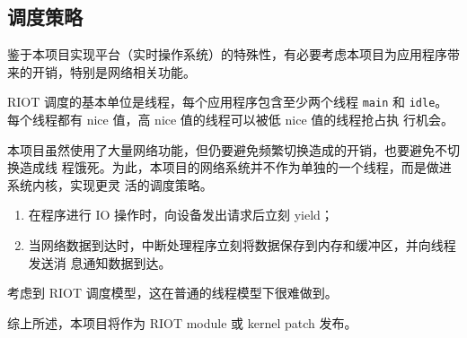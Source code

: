 \documentclass{ctexart}
\begin{document}
\subsection{调度策略}
鉴于本项目实现平台（实时操作系统）的特殊性，有必要考虑本项目为应用程序带来的开销，特别是网络相关功能。

RIOT 调度的基本单位是线程，每个应用程序包含至少两个线程 \verb|main| 和
\verb|idle|。每个线程都有 nice 值，高 nice 值的线程可以被低 nice 值的线程抢占执
行机会。

本项目虽然使用了大量网络功能，但仍要避免频繁切换造成的开销，也要避免不切换造成线
程饿死。为此，本项目的网络系统并不作为单独的一个线程，而是做进系统内核，实现更灵
活的调度策略。
\begin{enumerate}
\item 在程序进行 IO 操作时，向设备发出请求后立刻 yield；
\item 当网络数据到达时，中断处理程序立刻将数据保存到内存和缓冲区，并向线程发送消
  息通知数据到达。
\end{enumerate}
考虑到 RIOT 调度模型，这在普通的线程模型下很难做到。

综上所述，本项目将作为 RIOT module 或 kernel patch 发布。
\end{document}
